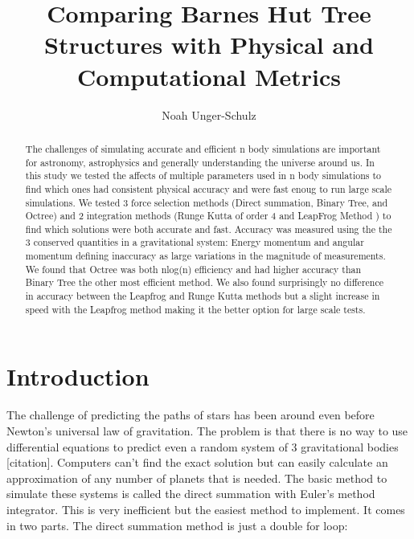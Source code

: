 \documentclass[11pt]{article}
\title{Comparing Barnes Hut Tree Structures with Physical and Computational Metrics}
\author{Noah Unger-Schulz}
\date{} %
\begin{document}
\maketitle

\begin{abstract}

 The challenges of simulating accurate and efficient n body simulations are important for astronomy, astrophysics and generally understanding the universe around us. In this study we tested the affects of multiple parameters used in n body simulations to find which ones had consistent physical accuracy and were fast enoug to run large scale simulations. We tested 3 force selection methods (Direct summation, Binary Tree, and Octree) and 2 integration methods (Runge Kutta of order 4 and LeapFrog Method ) to find which solutions were both accurate and fast. Accuracy was measured using the the 3 conserved quantities in a gravitational system: Energy momentum and angular momentum defining inaccuracy as large variations in the magnitude of measurements. We found that Octree was both nlog(n) efficiency and had higher accuracy than Binary Tree the other most efficient method. We also found surprisingly no difference in accuracy between the Leapfrog and Runge Kutta methods but a slight increase in speed with the Leapfrog method making it the better option for large scale tests.
  
  
  
  
\end{abstract}

\section{Introduction}

The challenge of predicting the paths of stars has been around even before Newton’s universal law of gravitation. The problem is that there is no way to use differential equations to predict even a random system of 3 gravitational bodies  [citation]. Computers can’t find the exact solution but can easily calculate an approximation of any number of planets that is needed. The basic method to simulate these systems is called the direct summation with Euler's method integrator. This is very inefficient but the easiest method to implement. It comes in two parts. The direct summation method is just a double for loop:
\end{document}
